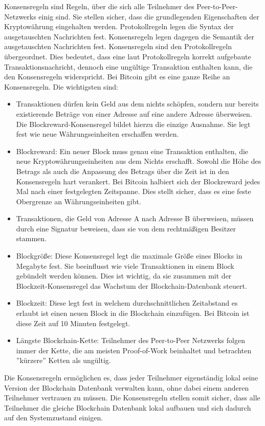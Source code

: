 Konsensregeln sind Regeln, über die sich alle Teilnehmer des Peer-to-Peer-Netzwerks einig sind. Sie stellen sicher, dass die grundlegenden Eigenschaften der Kryptowährung eingehalten werden. 
\if
Protokollregeln legen die Syntax der ausgetauschten Nachrichten fest. Konsensregeln legen dagegen die Semantik der ausgetauschten Nachrichten fest. 
Konsensregeln sind den Protokollregeln übergeordnet. Dies bedeutet, dass eine laut Protokollregeln korrekt aufgebaute Transaktionsnachricht, dennoch eine ungültige Transaktion enthalten kann, die den Konsensregeln widerspricht.
\fi
Bei Bitcoin gibt es eine ganze Reihe an Konsensregeln. Die wichtigsten sind:
\begin{itemize}
\item Transaktionen dürfen kein Geld aus dem nichts schöpfen, sondern nur bereits existierende Beträge von einer Adresse auf eine andere Adresse überweisen. Die Blockreward-Konsensregel bildet hierzu die einzige Ausnahme. Sie legt fest wie neue Währungseinheiten erschaffen werden.
\item Blockreward: Ein neuer Block muss genau eine Transaktion enthalten, die neue Kryptowährungseinheiten aus dem Nichts erschafft. Sowohl die Höhe des Betrags als auch die Anpassung des Betrags über die Zeit ist in den Konsensregeln hart verankert. Bei Bitcoin halbiert sich der Blockreward jedes Mal nach einer festgelegten Zeitspanne. Dies stellt sicher, dass es eine feste Obergrenze an Währungseinheiten gibt.
\item Transaktionen, die Geld von Adresse A nach Adresse B überweisen, müssen durch eine Signatur beweisen, dass sie von dem rechtmäßigen Besitzer stammen.
\item Blockgröße: Diese Konsensregel legt die maximale Größe eines Blocks in Megabyte fest. Sie beeinflusst wie viele Transaktionen in einem Block gebündelt werden können. Dies ist wichtig, da sie zusammen mit der Blockzeit-Konsensregel das Wachstum der Blockchain-Datenbank steuert.
\item Blockzeit: Diese legt fest in welchem durchschnittlichen Zeitabstand es erlaubt ist einen neuen Block in die Blockchain einzufügen. Bei Bitcoin ist diese Zeit auf 10 Minuten festgelegt.
\item Längste Blockchain-Kette: Teilnehmer des Peer-to-Peer Netzwerks folgen immer der Kette, die am meisten Proof-of-Work beinhaltet und betrachten ''kürzere'' Ketten als ungültig.
\end{itemize}
Die Konsensregeln ermöglichen es, dass jeder Teilnehmer eigenständig lokal seine Version der Blockchain Datenbank verwalten kann, ohne dabei einem anderen Teilnehmer vertrauen zu müssen. Die Konsensregeln stellen somit sicher, dass alle Teilnehmer die gleiche Blockchain Datenbank lokal aufbauen und sich dadurch auf den Systemzustand einigen.

